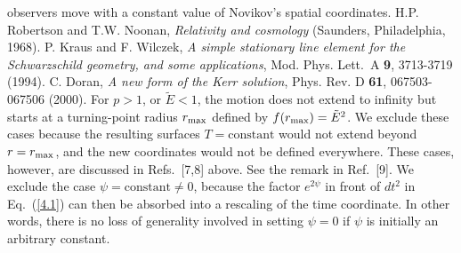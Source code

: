 \begin{references}
   observers move with a constant value of Novikov's spatial
   coordinates.           
   H.P. Robertson and T.W. Noonan, {\it Relativity and cosmology}
   (Saunders, Philadelphia, 1968).
   P. Kraus and F. Wilczek, {\it A simple stationary line element for
   the Schwarzschild geometry, and some applications}, 
   Mod. Phys. Lett.~A {\bf 9}, 3713-3719 (1994).
   C. Doran, {\it A new form of the Kerr solution}, 
   Phys. Rev. D {\bf 61}, 067503-067506 (2000). 
   For $p > 1$, or $\tilde{E} < 1$, the motion does not extend to
   infinity but starts at a turning-point radius $r_{\rm max}$ defined
   by $f(r_{\rm max}) = \tilde{E}^2$. We exclude these cases because
   the resulting surfaces $T = \mbox{constant}$ would not extend
   beyond $r = r_{\rm max}$, and the new coordinates would not be
   defined everywhere. These cases, however, are discussed in
   Refs.~[7,8] above. See the remark in Ref.~[9].     
   We exclude the case $\psi = \mbox{constant} \neq 0$, because the
   factor $e^{2\psi}$ in front of $dt^2$ in Eq.~(\ref{4.1}) can then
   be absorbed into a rescaling of the time coordinate. In other
   words, there is no loss of generality involved in setting $\psi =
   0$ if $\psi$ is initially an arbitrary constant.     
\end{references} 








